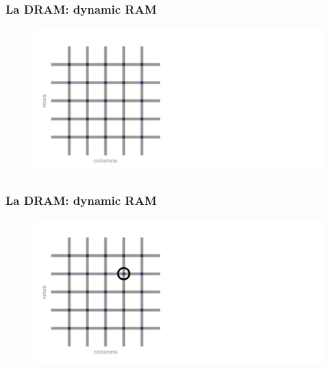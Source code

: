\begin{frame}
	\frametitle{La DRAM: dynamic RAM}
	 
	\begin{figure}[!htbp] 
		\centering
		\includegraphics[width=1.0\linewidth]{images/5_memory/dram_matrix_1.pdf}
	\end{figure}
	
\end{frame}

\begin{frame}
	\frametitle{La DRAM: dynamic RAM}
	 
	\begin{figure}[!htbp] 
		\centering
		\includegraphics[width=1.0\linewidth]{images/5_memory/dram_matrix_2.pdf}
	\end{figure}
	
\end{frame}

